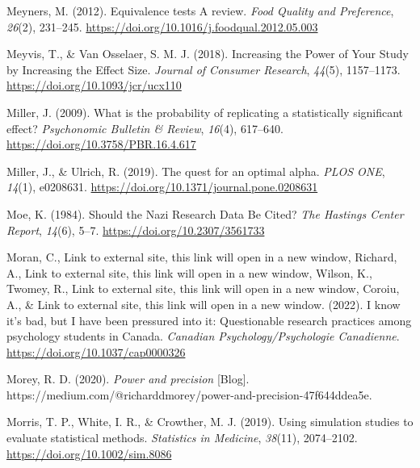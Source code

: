 \documentclass[
  letterpaper,
  DIV=11,
  numbers=noendperiod]{scrreprt}
\newlength{\cslhangindent}
\newlength{\cslentryspacingunit} %
\newenvironment{CSLReferences}[2] %
 {%
  \setlength{\parindent}{0pt}
  \ifodd #1
  \let\oldpar\par
  \def\par{\hangindent=\cslhangindent\oldpar}
  \fi
  \setlength{\parskip}{#2\cslentryspacingunit}
 }%
 {}
\begin{document}
\begin{CSLReferences}{1}{0}
\leavevmode{}%
Meyners, M. (2012). Equivalence tests \textendash{} {A} review.
\emph{Food Quality and Preference}, \emph{26}(2), 231--245.
\url{https://doi.org/10.1016/j.foodqual.2012.05.003}

\leavevmode{}%
Meyvis, T., \& Van Osselaer, S. M. J. (2018). Increasing the {Power} of
{Your Study} by {Increasing} the {Effect Size}. \emph{Journal of
Consumer Research}, \emph{44}(5), 1157--1173.
\url{https://doi.org/10.1093/jcr/ucx110}

\leavevmode{}%
Miller, J. (2009). What is the probability of replicating a
statistically significant effect? \emph{Psychonomic Bulletin \& Review},
\emph{16}(4), 617--640. \url{https://doi.org/10.3758/PBR.16.4.617}

\leavevmode{}%
Miller, J., \& Ulrich, R. (2019). The quest for an optimal alpha.
\emph{PLOS ONE}, \emph{14}(1), e0208631.
\url{https://doi.org/10.1371/journal.pone.0208631}

\leavevmode{}%
Moe, K. (1984). Should the {Nazi Research Data Be Cited}? \emph{The
Hastings Center Report}, \emph{14}(6), 5--7.
\url{https://doi.org/10.2307/3561733}

\leavevmode{}%
Moran, C., Link to external site, this link will open in a new window,
Richard, A., Link to external site, this link will open in a new window,
Wilson, K., Twomey, R., Link to external site, this link will open in a
new window, Coroiu, A., \& Link to external site, this link will open in
a new window. (2022). I know it's bad, but {I} have been pressured into
it: {Questionable} research practices among psychology students in
{Canada}. \emph{Canadian Psychology/Psychologie Canadienne}.
\url{https://doi.org/10.1037/cap0000326}

\leavevmode{}%
Morey, R. D. (2020). \emph{Power and precision} {[}Blog{]}.
https://medium.com/@richarddmorey/power-and-precision-47f644ddea5e.

\leavevmode{}%
Morris, T. P., White, I. R., \& Crowther, M. J. (2019). Using simulation
studies to evaluate statistical methods. \emph{Statistics in Medicine},
\emph{38}(11), 2074--2102. \url{https://doi.org/10.1002/sim.8086}


\end{CSLReferences}
\end{document}
